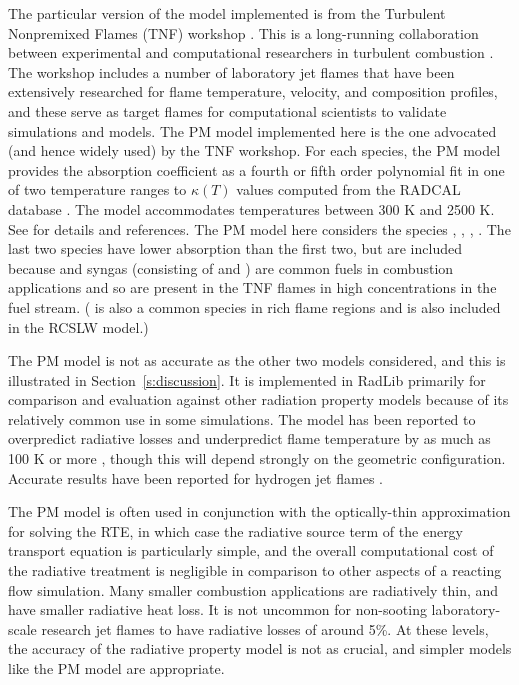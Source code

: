 \documentclass[preprint,12pt]{elsarticle}
\begin{document}
The particular version of the model implemented is from the Turbulent Nonpremixed Flames (TNF) workshop \cite{TNF}. This is a long-running collaboration between experimental and computational researchers in turbulent combustion \citep{Smith_2003,Barlow_2001}. The workshop includes a number of laboratory jet flames that have been extensively researched for flame temperature, velocity, and composition profiles, and these serve as target flames for computational scientists to validate simulations and models. The PM model implemented here is the one advocated (and hence widely used) by the TNF workshop. For each species, the PM model provides the absorption coefficient as a fourth or fifth order polynomial fit in one of two temperature ranges to $\kappa(T)$ values computed from the RADCAL database \cite{Grosshandler_1993}. The model accommodates temperatures between 300 K and 2500 K. See \cite{TNF} for details and references. The PM model here considers the species , , , .  The last two species have lower absorption than the first two, but are included because  and syngas (consisting of  and ) are common fuels in combustion applications and so are present in the TNF flames in high concentrations in the fuel stream. ( is also a common species in rich flame regions and is also included in the RCSLW model.)

The PM model is not as accurate as the other two models considered, and this is illustrated in Section~\ref{s:discussion}.
It is implemented in RadLib primarily for comparison and evaluation against other radiation property models because of its relatively common use in some simulations.
The model has been reported to overpredict radiative losses and underpredict flame temperature by as much as 100 K or more \cite{Frank_2000,Zhu_2002,Coelho_2002}, though this will depend strongly on the geometric configuration. Accurate results have been reported for hydrogen jet flames \cite{Barlow_1999}.

The PM model is often used in conjunction with the optically-thin approximation for solving the RTE, in which case the radiative source term of the energy transport equation is particularly simple, and the overall computational cost of the radiative treatment is negligible in comparison to other aspects of a reacting flow simulation. Many smaller combustion applications are radiatively thin, and have smaller radiative heat loss. It is not uncommon for non-sooting laboratory-scale research jet flames to have radiative losses of around 5\%. At these levels, the accuracy of the radiative property model is not as crucial, and simpler models like the PM model are appropriate.
\end{document}
